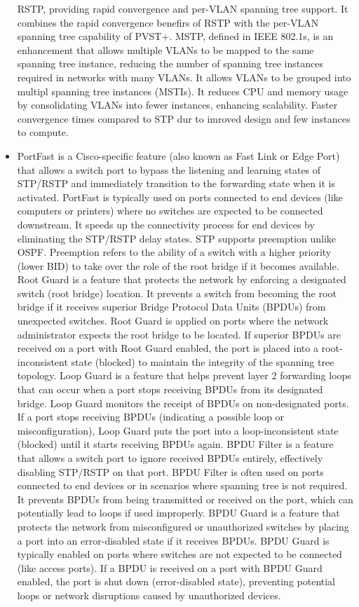 \documentclass{article}
\begin{document}
\begin{itemize}
RSTP, providing rapid convergence and per-VLAN spanning tree support. It combines the rapid convergence benefirs of RSTP with the per-VLAN spanning tree capability of PVST+. MSTP, defined in IEEE 802.1s, is an enhancement that allows multiple VLANs to be mapped to the same spanning tree instance, reducing the number of spanning tree instances required in networks with many VLANs. It allows VLANs to be grouped into multipl spanning tree instances (MSTIs). It reduces CPU and memory usage by consolidating VLANs into fewer instances, enhancing scalability. Faster convergence times compared to STP dur to imroved design and few instances to compute.
	\item[] PortFast is a Cisco-specific feature (also known as Fast Link or Edge Port) that allows a switch port to bypass the listening and learning states of STP/RSTP and immediately transition to the forwarding state when it is activated. PortFast is typically used on ports connected to end devices (like computers or printers) where no switches are expected to be connected downstream. It speeds up the connectivity process for end devices by eliminating the STP/RSTP delay states. STP supports preemption unlike OSPF. Preemption refers to the ability of a switch with a higher priority (lower BID) to take over the role of the root bridge if it becomes available. Root Guard is a feature that protects the network by enforcing a designated switch (root bridge) location. It prevents a switch from becoming the root bridge if it receives superior Bridge Protocol Data Units (BPDUs) from unexpected switches. Root Guard is applied on ports where the network administrator expects the root bridge to be located. If superior BPDUs are received on a port with Root Guard enabled, the port is placed into a root-inconsistent state (blocked) to maintain the integrity of the spanning tree topology. Loop Guard is a feature that helps prevent layer 2 forwarding loops that can occur when a port stops receiving BPDUs from its designated bridge. Loop Guard monitors the receipt of BPDUs on non-designated ports. If a port stops receiving BPDUs (indicating a possible loop or misconfiguration), Loop Guard puts the port into a loop-inconsistent state (blocked) until it starts receiving BPDUs again. BPDU Filter is a feature that allows a switch port to ignore received BPDUs entirely, effectively disabling STP/RSTP on that port. BPDU Filter is often used on ports connected to end devices or in scenarios where spanning tree is not required. It prevents BPDUs from being transmitted or received on the port, which can potentially lead to loops if used improperly. BPDU Guard is a feature that protects the network from misconfigured or unauthorized switches by placing a port into an error-disabled state if it receives BPDUs. BPDU Guard is typically enabled on ports where switches are not expected to be connected (like access ports). If a BPDU is received on a port with BPDU Guard enabled, the port is shut down (error-disabled state), preventing potential loops or network disruptions caused by unauthorized devices.
  

\end{itemize}
\end{document}
